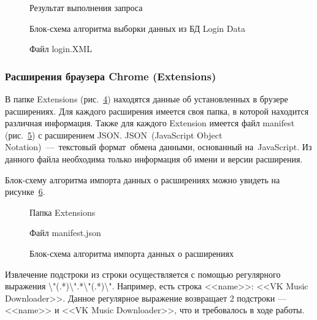 \begin{figure}[h!]
\caption{Результат выполнения запроса}
\label{ship_2:ship_2}
\end{figure}

\begin{figure}[h!]
\caption{Блок-схема алгоритма выборки данных из БД Login Data}
\label{ship_3:ship_3}
\end{figure} 

\begin{figure}[h!]
\caption{Файл login.XML}
\label{ship_4:ship_4}
\end{figure} 

\clearpage
\subsubsection{Расширения браузера Chrome (Extensions)}

В папке Extensions (рис.~\ref{ship_5:ship_5}) находятся данные об установленных в брузере расширениях. Для каждого расширения имеется своя папка, в которой находится различная информация. Также для каждого Extension имеется файл manifest (рис.~\ref{ship_6:ship_6}) с расширением JSON. JSON (JavaScript Object Notation) --- текстовый формат обмена данными, основанный на JavaScript. Из данного файла необходима только информация об имени и версии расширения.

Блок-схему алгоритма импорта данных о расширениях можно увидеть на рисунке~\ref{ship_7:ship_7}. 

\begin{figure}[h!]
\caption{Папка Extensions}
\label{ship_5:ship_5}
\end{figure}

\begin{figure}[h!]
\caption{Файл manifest.json}
\label{ship_6:ship_6}
\end{figure}

\begin{figure}[h!]
\caption{Блок-схема алгоритма импорта данных о расширениях}
\label{ship_7:ship_7}
\end{figure}

\clearpage
Извлечение подстроки из строки осуществляется с помощью регулярного выражения \textbackslash"(.*)\textbackslash".*\textbackslash"(.*)\textbackslash". Например, есть строка <<name>>: <<VK Music Downloader>>. Данное регулярное выражение возвращает 2 подстроки --- <<name>> и <<VK Music Downloader>>, что и требовалось в ходе работы.

